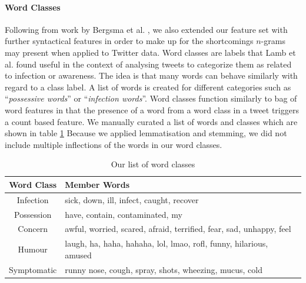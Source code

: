 \documentclass[10pt,letterpaper]{article}
\begin{document}
\paragraph{Word Classes} 
Following from work by Bergsma et al. \cite{REF17}, we also extended our feature set with further syntactical features in order to make up for the shortcomings $n$-grams may present when applied to Twitter data.   Word classes are labels that  Lamb et al. \cite{REF18} found useful in the context of analysing tweets to categorize them as related to infection or awareness. The idea is that many words can behave similarly with regard to a class label. A list of words is created for different categories such as ``\textit{possessive words}'' or ``\textit{infection words}''. Word classes function similarly to bag of word features in that the presence of a word from a word class in a tweet triggers a count based feature. We manually curated a list of words and classes which are shown in table \ref{table:wordclass} Because we applied lemmatisation and stemming, we did not include multiple inflections of the words in our word classes.
    
\begin{table}[h!]
\centering
\begin{tabular}{ | c | p{5cm} | } 
\hline
 Word Class & Member Words \\ 
\hline
Infection & sick, down, ill, infect, caught, recover  \\ 
 \hline
 Possession & have, contain, contaminated, my \\
 \hline
 Concern & awful, worried, scared, afraid, terrified, fear, sad, unhappy, feel \\
 \hline
 Humour & laugh, ha, haha, hahaha, lol, lmao, rofl, funny, hilarious, amused \\
 \hline
 Symptomatic & runny nose, cough, spray, shots, wheezing, mucus, cold \\
 \hline
\end{tabular}
\caption{Our list of word classes}
\label{table:wordclass}
\end{table}
    
\end{document}
